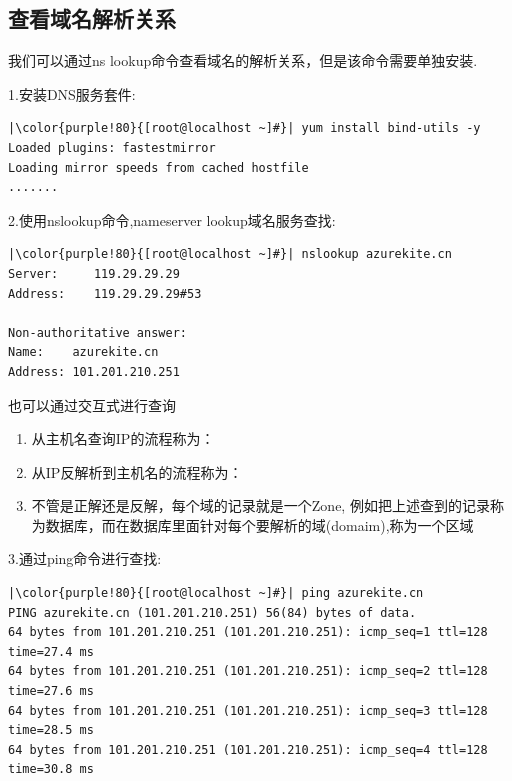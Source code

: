 \subsection{查看域名解析关系}
我们可以通过ns lookup命令查看域名的解析关系，但是该命令需要单独安装.
	\begin{ascboxB}{1.安装DNS服务套件:}
\begin{verbatim}
|\color{purple!80}{[root@localhost ~]#}| yum install bind-utils -y
Loaded plugins: fastestmirror
Loading mirror speeds from cached hostfile
.......
\end{verbatim}
	\end{ascboxB}
	\begin{ascboxB}{2.使用nslookup命令,nameserver lookup域名服务查找:}
\begin{verbatim}
|\color{purple!80}{[root@localhost ~]#}| nslookup azurekite.cn
Server:     119.29.29.29
Address:    119.29.29.29#53

Non-authoritative answer:
Name:    azurekite.cn
Address: 101.201.210.251
\end{verbatim}
	\end{ascboxB}
也可以通过交互式进行查询
\begin{enumerate}
\item 从主机名查询IP的流程称为：
\item 从IP反解析到主机名的流程称为：
\item 不管是正解还是反解，每个域的记录就是一个Zone, 例如把上述查到的记录称为数据库，而在数据库里面针对每个要解析的域(domaim),称为一个区域
\end{enumerate}
	\begin{ascboxB}{3.通过ping命令进行查找:}
\begin{verbatim}
|\color{purple!80}{[root@localhost ~]#}| ping azurekite.cn
PING azurekite.cn (101.201.210.251) 56(84) bytes of data.
64 bytes from 101.201.210.251 (101.201.210.251): icmp_seq=1 ttl=128 time=27.4 ms
64 bytes from 101.201.210.251 (101.201.210.251): icmp_seq=2 ttl=128 time=27.6 ms
64 bytes from 101.201.210.251 (101.201.210.251): icmp_seq=3 ttl=128 time=28.5 ms
64 bytes from 101.201.210.251 (101.201.210.251): icmp_seq=4 ttl=128 time=30.8 ms
\end{verbatim}
	\end{ascboxB}
\btrule{}

